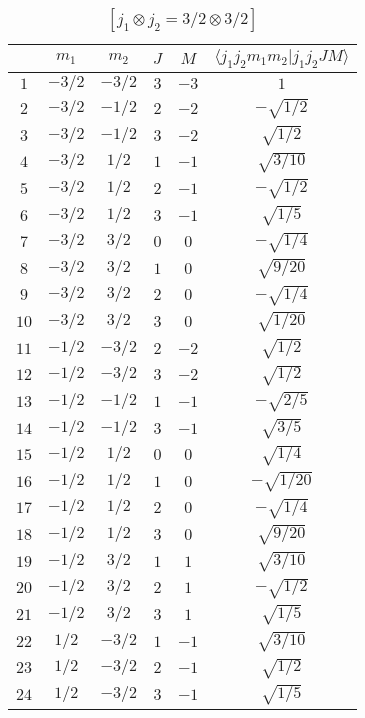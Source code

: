 \begin{table}
\tiny
\caption{$[j_1 \otimes j_2 = 3/2 \otimes 3/2]$}
\begin{center}
\begin{tabular}{|c|c|c|c|c|c|}
\hline 
   & $m_1$ & $m_2$ & $J$ & $M$ & $\langle j_1 j_2 m_1 m_2 | j_1 j_2 J M \rangle$ \\ 
\hline 
$1$ & $-3/2$ & $-3/2$ & $3$ & $-3$ & $1$ \\ 
$2$ & $-3/2$ & $-1/2$ & $2$ & $-2$ & $-\sqrt{1/2}$ \\ 
$3$ & $-3/2$ & $-1/2$ & $3$ & $-2$ & $\sqrt{1/2}$ \\ 
$4$ & $-3/2$ & $1/2$ & $1$ & $-1$ & $\sqrt{3/10}$ \\ 
$5$ & $-3/2$ & $1/2$ & $2$ & $-1$ & $-\sqrt{1/2}$ \\ 
$6$ & $-3/2$ & $1/2$ & $3$ & $-1$ & $\sqrt{1/5}$ \\ 
$7$ & $-3/2$ & $3/2$ & $0$ & $0$ & $-\sqrt{1/4}$ \\ 
$8$ & $-3/2$ & $3/2$ & $1$ & $0$ & $\sqrt{9/20}$ \\ 
$9$ & $-3/2$ & $3/2$ & $2$ & $0$ & $-\sqrt{1/4}$ \\ 
$10$ & $-3/2$ & $3/2$ & $3$ & $0$ & $\sqrt{1/20}$ \\ 
$11$ & $-1/2$ & $-3/2$ & $2$ & $-2$ & $\sqrt{1/2}$ \\ 
$12$ & $-1/2$ & $-3/2$ & $3$ & $-2$ & $\sqrt{1/2}$ \\ 
$13$ & $-1/2$ & $-1/2$ & $1$ & $-1$ & $-\sqrt{2/5}$ \\ 
$14$ & $-1/2$ & $-1/2$ & $3$ & $-1$ & $\sqrt{3/5}$ \\ 
$15$ & $-1/2$ & $1/2$ & $0$ & $0$ & $\sqrt{1/4}$ \\ 
$16$ & $-1/2$ & $1/2$ & $1$ & $0$ & $-\sqrt{1/20}$ \\ 
$17$ & $-1/2$ & $1/2$ & $2$ & $0$ & $-\sqrt{1/4}$ \\ 
$18$ & $-1/2$ & $1/2$ & $3$ & $0$ & $\sqrt{9/20}$ \\ 
$19$ & $-1/2$ & $3/2$ & $1$ & $1$ & $\sqrt{3/10}$ \\ 
$20$ & $-1/2$ & $3/2$ & $2$ & $1$ & $-\sqrt{1/2}$ \\ 
$21$ & $-1/2$ & $3/2$ & $3$ & $1$ & $\sqrt{1/5}$ \\ 
$22$ & $1/2$ & $-3/2$ & $1$ & $-1$ & $\sqrt{3/10}$ \\ 
$23$ & $1/2$ & $-3/2$ & $2$ & $-1$ & $\sqrt{1/2}$ \\ 
$24$ & $1/2$ & $-3/2$ & $3$ & $-1$ & $\sqrt{1/5}$ \\ 

\end{tabular}
\end{center}
\end{table}
